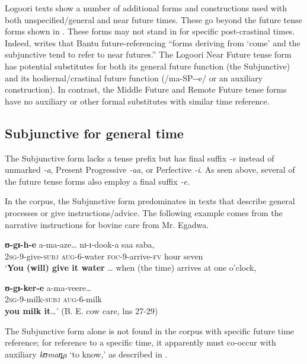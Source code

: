 \documentclass[output=paper]{langsci/langscibook}
\begin{document}
Logoori texts show a number of additional forms and constructions used with both unspecified/general and near future times. These go beyond the future tense forms shown in . These forms may not stand in for specific post-crastinal times. Indeed, \citet[85]{Nurse2008} writes that Bantu future-referencing “forms deriving from ‘come’ and the subjunctive tend to refer to near futures.” The Logoori Near Future tense form has potential substitutes for both its general future function (the Subjunctive) and its hodiernal/crastinal future function (/ma-SP-{\longrule}-e/ or an auxiliary construction). In contrast, the Middle Future and Remote Future tense forms have no auxiliary or other formal substitutes with similar time reference.

\subsection{Subjunctive for general time} \label{sec:sarvasy:7.1}

The Subjunctive form lacks a tense prefix but has final suffix \textit{-e} instead of unmarked \textit{-a}, Present Progressive \textit{-aa}, or Perfective \textit{-i}. As seen above, several of the future tense forms also employ a final suffix \textit{-e.} 

In the corpus, the Subjunctive form predominates in texts that describe general processes or give instructions/advice. The following example comes from the narrative instructions for bovine care from Mr. Egadwa. 

\ea\label{ex:sarvasy:18}
\gll \textbf{ʊ-gɪ-h-e}     a-ma-aze…   nɪ-ɪ-dook-a   saa   saba, \\  
\textsc{\textup{2sg}}\textsc{-}9-give-\textsc{subj}  \textsc{aug}-6-water  \textsc{foc}-9-arrive-\textsc{fv}  hour  seven \\
\glt ‘\textbf{You (will) give it water} … when (the time) arrives at one o’clock,

\gll \textbf{ʊ-gɪ-ker-e}   a-ma-veere\ldots \\
\textsc{2sg}-9-milk-\textsc{subj}  \textsc{aug}-6-milk \\
\glt \textbf{you milk it}…’ (B. E. cow care, lns 27-29)
\z

The Subjunctive form alone is not found in the corpus with specific future time reference; for reference to a specific time, it apparently must co-occur with auxiliary \textit{kʊman̪a} ‘to know,’ as described in . 
\end{document}
